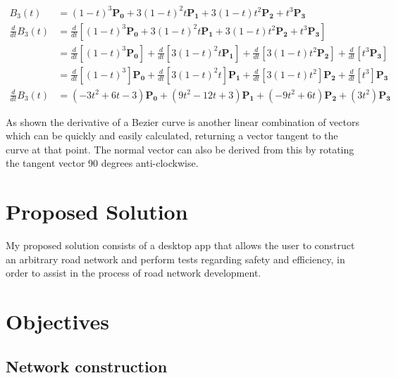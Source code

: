         \begin{align*}
            B_3(t) &= (1 - t)^3\mathbf{P_0} + 3(1 - t)^2t\mathbf{P_1} + 3(1 - t)t^2\mathbf{P_2} + t^3\mathbf{P_3}\\
            \frac{d}{dt}B_3(t) &= \frac{d}{dt}\left[(1 - t)^3\mathbf{P_0} + 3(1 - t)^2t\mathbf{P_1} + 3(1 - t)t^2\mathbf{P_2} + t^3\mathbf{P_3}\right]\\
            &= \frac{d}{dt}\left[(1 - t)^3\mathbf{P_0}\right] + \frac{d}{dt}\left[3(1 - t)^2t\mathbf{P_1}\right] + \frac{d}{dt}\left[3(1 - t)t^2\mathbf{P_2}\right] + \frac{d}{dt}\left[t^3\mathbf{P_3}\right]\\
            &= \frac{d}{dt}\left[(1 - t)^3\right]\mathbf{P_0} + \frac{d}{dt}\left[3(1 - t)^2t\right]\mathbf{P_1} + \frac{d}{dt}\left[3(1 - t)t^2\right]\mathbf{P_2} + \frac{d}{dt}\left[t^3\right]\mathbf{P_3}\\
            \frac{d}{dt}B_3(t) &= (-3t^2 + 6t - 3)\mathbf{P_0} + (9t^2 - 12t + 3)\mathbf{P_1} + (-9t^2 + 6t)\mathbf{P_2} + (3t^2)\mathbf{P_3}
        \end{align*}

        As shown the derivative of a Bezier curve is another linear combination of vectors which can be quickly and easily calculated, returning a vector tangent to the curve at that point. The normal vector can also be derived from this by rotating the tangent vector 90 degrees anti-clockwise.

\section{Proposed Solution}

    My proposed solution consists of a desktop app that allows the user to construct an arbitrary road network and perform tests regarding safety and efficiency, in order to assist in the process of road network development.

\section{Objectives}
\label{analysis:objectives}

    \subsection{Network construction}

